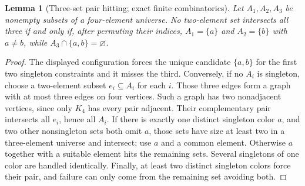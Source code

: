 \documentclass[11pt]{article}
\newtheorem{lemma}[theorem]{Lemma}
\begin{document}
\begin{lemma}[Three-set pair hitting; exact finite combinatorics]
Let $A_1,A_2,A_3$ be nonempty subsets of a four-element universe.
No two-element set intersects all three if and only if, after
permuting their indices, $A_1=\{a\}$ and $A_2=\{b\}$ with
$a\ne b$, while $A_3\cap\{a,b\}=\varnothing$.
\end{lemma}
\begin{proof}
The displayed configuration forces the unique candidate
$\{a,b\}$ for the first two singleton constraints and it misses the third.
Conversely, if no $A_i$ is singleton, choose a two-element subset
$e_i\subseteq A_i$ for each $i$. Those three edges form a graph with
at most three edges on four vertices. Such a graph has two
nonadjacent vertices, since only $K_4$ has every pair adjacent.
Their complementary pair intersects all $e_i$, hence all $A_i$.
If there is exactly one distinct singleton color $a$, and two
other nonsingleton sets both omit $a$, those sets have size at least
two in a three-element universe and intersect; use $a$ and a
common element. Otherwise $a$ together with a suitable element
hits the remaining sets. Several singletons of one color are
handled identically. Finally, at least two distinct singleton
colors force their pair, and failure can only come from the
remaining set avoiding both.
\end{proof}
\end{document}
